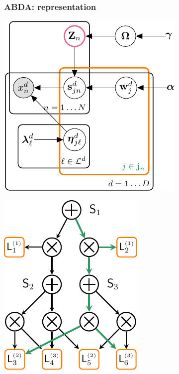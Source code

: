 \documentclass[xcolor={usenames,dvipsnames,svgnames}, compress, aspectratio=169, 11pt]{beamer}
\begin{document}
\begin{frame}[t, htt=bgrey2]
  \frametitle{ABDA: representation}

  \large
  \begin{minipage}[t]{0.3\linewidth}
    \includegraphics[width=.99\linewidth]{figures/joint-param-hspn-crop}
  \end{minipage}\hfill\begin{minipage}[t]{0.3\linewidth}
    \includegraphics[width=.99\linewidth]{figures/hspn}

\end{minipage}
\end{frame}
\end{document}
